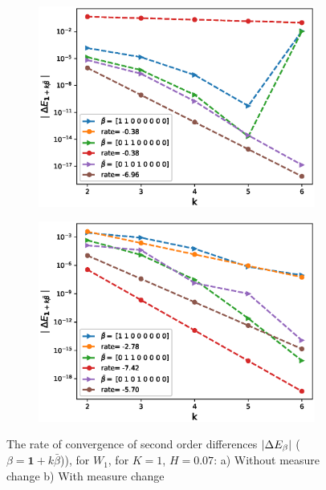 \documentclass[11pt]{article}
\begin{document}
\begin{figure}[h!]
	\centering
	\begin{subfigure}{.45\textwidth}
		\centering
		\includegraphics[width=1\linewidth]{./figures/rBergomi_mixed_error_rates/without_change_measure/N_4/H_007/mixed_difference_order2_rbergomi_4steps_H_007_K_1_totally_hierarch_with_rate_W1_2}
		\caption{}
		\label{fig:sub3}
	\end{subfigure}%
	\begin{subfigure}{.45\textwidth}
		\centering
		\includegraphics[width=1\linewidth]{./figures/rBergomi_mixed_error_rates/partial_change_measure/N_4/H_007/mixed_difference_order2_rbergomi_4steps_H_007_K_1_totally_hierarch_with_rate_W1_2_change_measure_part_spec}
		\caption{}
		\label{fig:sub4}
	\end{subfigure}
	
	\caption{The rate of convergence of  second order differences $\left\lvert\Delta E_{\beta}\right\rvert$ ($\beta=\mathbf{1}+k \bar{\beta}$)), for $W_1$, for $K=1$, $H=0.07$: a) Without measure change b) With measure change}
	\label{fig:second_diff_comp_K_1_H_007_W_1_2}
\end{figure}
\end{document}
